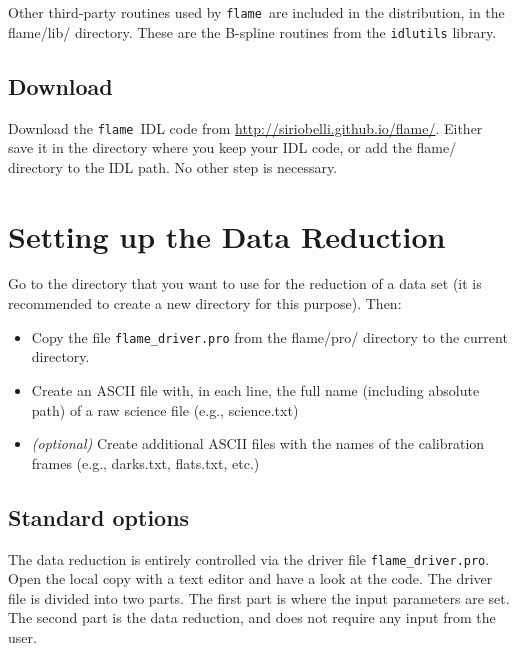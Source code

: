\documentclass[a4paper, notitlepage]{article}
\newcommand{\flame}{\texttt{flame}}
\begin{document}
Other third-party routines used by \flame\ are included in the distribution, in the flame/lib/ directory. These are the B-spline routines from the \texttt{idlutils} library.


\subsection{Download}

Download the \flame\ IDL code from \url{http://siriobelli.github.io/flame/}. Either save it in the directory where you keep your IDL code, or add the flame/ directory to the IDL path. No other step is necessary.







\newpage

\section{Setting up the Data Reduction}

Go to the directory that you want to use for the reduction of a data set (it is recommended to create a new directory for this purpose). Then:
\begin{itemize}
\item Copy the file \texttt{flame\_driver.pro} from the flame/pro/ directory to the current directory.
\item Create an ASCII file with, in each line, the full name (including absolute path) of a raw science file (e.g., science.txt)
\item \emph{(optional)} Create additional ASCII files with the names of the calibration frames (e.g., darks.txt, flats.txt, etc.)
\end{itemize}


\subsection{Standard options}

The data reduction is entirely controlled via the driver file \texttt{flame\_driver.pro}. Open the local copy with a text editor and have a look at the code. The driver file is divided into two parts. The first part is where the input parameters are set. The second part is the data reduction, and does not require any input from the user.
\end{document}
